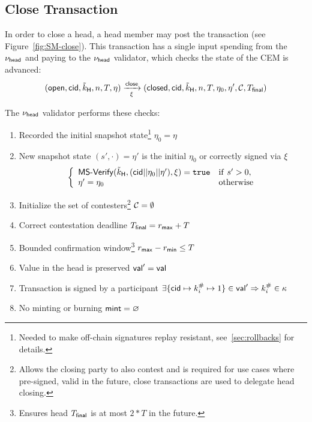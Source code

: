 \subsection{Close Transaction}\label{sec:close-tx}

In order to close a head, a head member may post the \mtxClose{} transaction
(see Figure~\ref{fig:SM-close}). This transaction has a single input
spending from the $\nu_\mathsf{head}$ and paying to the $\nu_\mathsf{head}$ validator, which checks
the state of the CEM is advanced:
\[
  (\mathsf{open},\mathsf{cid},\tilde{k}_{\mathsf{H}},n,T,\eta) \xrightarrow[\xi]{\mathsf{close}} (\mathsf{closed},\mathsf{cid},\tilde{k}_{\mathsf{H}},n,T,\eta_0,\eta',\mathcal{C},T_{\mathsf{final}})
\]

\begin{samepage}
\noindent The $\nu_\mathsf{head}$ validator performs these checks:
\begin{enumerate}
  \item Recorded the initial snapshot state\footnote{Needed to make off-chain signatures replay resistant, see~\ref{sec:rollbacks} for details.} $\eta_0 = \eta$
  \item New snapshot state $(s', \cdot) = \eta'$ is the initial $\eta_{0}$
        or correctly signed via $\xi$ \\
        \[
          \left\{\begin{array}{ll}
                  \mathsf{MS\textsf{-}{}Verify}(\tilde{k}_{\mathsf{H}},(\mathsf{cid} || \eta_{0} || \eta'),\xi) = \mathtt{true} & \mathrm{if} ~ s' > 0, \\
                  \eta' = \eta_{0} & \mathrm{otherwise}
                 \end{array}\right.
        \]
  \item Initialize the set of contesters\footnote{Allows the closing party
        to also contest and is required for use cases where pre-signed, valid in
        the future, close transactions are used to delegate head closing.}
        $\mathcal{C} = \emptyset$
  \item Correct contestation deadline $T_{\mathsf{final}} = r_{\mathsf{max}} + T$
  \item Bounded confirmation window\footnote{Ensures head $T_{\mathsf{final}}$ is at most
        $2*T$ in the future.} $r_{\mathsf{max}} - r_{\mathsf{min}} \leq T$
  \item Value in the head is preserved $\mathsf{val}' = \mathsf{val}$
  \item Transaction is signed by a participant $\exists \{\mathsf{cid} \mapsto k^{\#}_{i} \mapsto 1\} \in \mathsf{val}' \Rightarrow k^{\#}_{i} \in \kappa$
  \item No minting or burning $\mathsf{mint} = \varnothing$
\end{enumerate}
\end{samepage}

